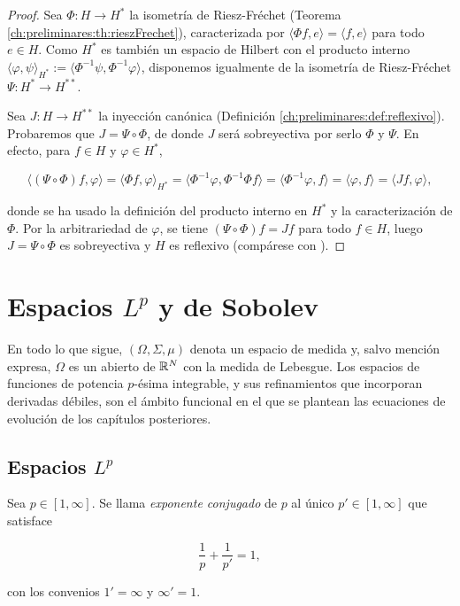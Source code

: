 \begin{proof}
Sea $\Phi : H \rightarrow H^*$ la isometría de Riesz-Fréchet
(Teorema \ref{ch:preliminares:th:rieszFrechet}), caracterizada por
$\langle \Phi f, e \rangle = \langle f, e \rangle$ para todo $e \in H$. Como $H^*$
es también un espacio de Hilbert con el producto interno
$\langle \varphi, \psi \rangle_{H^*} := \langle \Phi^{-1}\psi, \Phi^{-1}\varphi \rangle$,
disponemos igualmente de la isometría de Riesz-Fréchet
$\Psi : H^* \rightarrow H^{**}$.

Sea $J : H \rightarrow H^{**}$ la inyección canónica
(Definición \ref{ch:preliminares:def:reflexivo}). Probaremos que
$J = \Psi \circ \Phi$, de donde $J$ será sobreyectiva por serlo $\Phi$ y $\Psi$.
En efecto, para $f \in H$ y $\varphi \in H^*$,

\[\langle (\Psi \circ \Phi) f, \varphi \rangle = \langle \Phi f, \varphi \rangle_{H^*} = \langle \Phi^{-1}\varphi, \Phi^{-1}\Phi f \rangle = \langle \Phi^{-1}\varphi, f \rangle = \langle \varphi, f \rangle = \langle J f, \varphi \rangle,\]

donde se ha usado la definición del producto interno en $H^*$ y la
caracterización de $\Phi$. Por la arbitrariedad de $\varphi$, se tiene
$(\Psi \circ \Phi)f = Jf$ para todo $f \in H$, luego $J = \Psi \circ \Phi$ es
sobreyectiva y $H$ es reflexivo (compárese con \cite[Cap.~5]{brezis-2011-fun-ana-sob}).
\end{proof}

\section{Espacios $L^p$ y de Sobolev}
\label{ch:preliminares:section:sobolev}

En todo lo que sigue, $(\Omega, \Sigma, \mu)$ denota un espacio de medida y, salvo
mención expresa, $\Omega$ es un abierto de $\mathbb{R}^N$ con la medida de Lebesgue. Los
espacios de funciones de potencia $p$-ésima integrable, y sus refinamientos que
incorporan derivadas débiles, son el ámbito funcional en el que se plantean las
ecuaciones de evolución de los capítulos posteriores.

\subsection{Espacios $L^p$}
\label{ch:preliminares:subsection:Lp}

\begin{Definicion}
\label{ch:preliminares:def:conjugados}

Sea $p \in [1, \infty]$. Se llama \textit{exponente conjugado} de $p$ al único
$p' \in [1, \infty]$ que satisface

\[\frac{1}{p} + \frac{1}{p'} = 1,\]

con los convenios $1' = \infty$ y $\infty' = 1$.
\end{Definicion}

